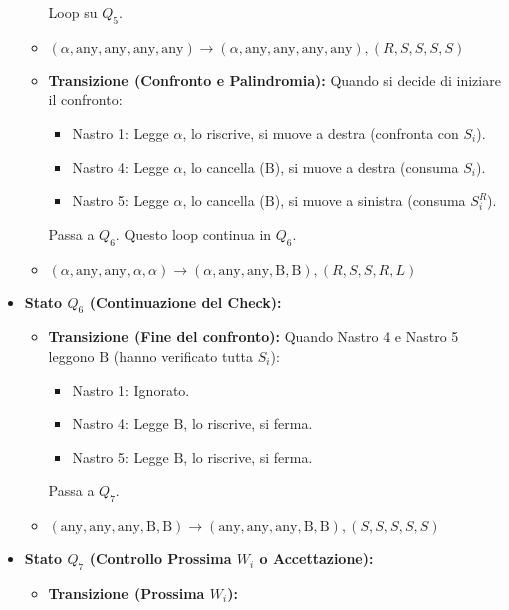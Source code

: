 \documentclass[a4paper]{article}
\newcommand{\B}{\text{B}} %
\newcommand{\alphaSym}{\alpha} %
\begin{document}
\begin{itemize}
\begin{itemize}
                Loop su $Q_5$.
                \item $(\alpha, \text{any}, \text{any}, \text{any}, \text{any}) \to (\alpha, \text{any}, \text{any}, \text{any}, \text{any}), (R,S,S,S,S)$
            \item \textbf{Transizione (Confronto e Palindromia):}
                Quando si decide di iniziare il confronto:
                \begin{itemize}
                    \item Nastro 1: Legge $\alphaSym$, lo riscrive, si muove a destra (confronta con $S_i$).
                    \item Nastro 4: Legge $\alphaSym$, lo cancella ($\B$), si muove a destra (consuma $S_i$).
                    \item Nastro 5: Legge $\alphaSym$, lo cancella ($\B$), si muove a sinistra (consuma $S_i^R$).
                \end{itemize}
                Passa a $Q_6$. Questo loop continua in $Q_6$.
                \item $(\alphaSym, \text{any}, \text{any}, \alphaSym, \alphaSym) \to (\alphaSym, \text{any}, \text{any}, \B, \B), (R,S,S,R,L)$
        \end{itemize}
    \item \textbf{Stato $Q_6$ (Continuazione del Check):}
        \begin{itemize}
            \item \textbf{Transizione (Fine del confronto):}
                Quando Nastro 4 e Nastro 5 leggono $\B$ (hanno verificato tutta $S_i$):
                \begin{itemize}
                    \item Nastro 1: Ignorato.
                    \item Nastro 4: Legge $\B$, lo riscrive, si ferma.
                    \item Nastro 5: Legge $\B$, lo riscrive, si ferma.
                \end{itemize}
                Passa a $Q_7$.
                \item $(\text{any}, \text{any}, \text{any}, \B, \B) \to (\text{any}, \text{any}, \text{any}, \B, \B), (S,S,S,S,S)$
        \end{itemize}
    \item \textbf{Stato $Q_7$ (Controllo Prossima $W_i$ o Accettazione):}
        \begin{itemize}
            \item \textbf{Transizione (Prossima $W_i$):}

\end{itemize}
\end{itemize}
\end{document}
